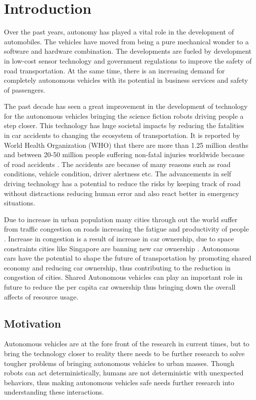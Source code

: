 \chapter{Introduction}
\label{introduction}

Over the past years, autonomy has played a vital role in the development of automobiles. The vehicles have moved from being a pure mechanical wonder to a software and hardware combination. The developments are fueled by development in low-cost sensor technology and government regulations to improve the safety of road transportation. At the same time, there is an increasing demand for completely autonomous vehicles with its potential in business services and safety of passengers.

The past decade has seen a great improvement in the development of technology for the autonomous vehicles bringing the science fiction robots driving people a step closer. This technology has huge societal impacts by reducing the fatalities in car accidents to changing the ecosystem of transportation. It is reported by World Health Organization (WHO) that there are more than 1.25 million deaths and between 20-50 million people suffering non-fatal injuries worldwide because of road accidents \cite{whoaccidents}. The accidents are because of many reasons such as road conditions, vehicle condition, driver alertness etc. The advancements in self driving technology has a potential to reduce the risks by keeping track of road without distractions reducing human error and also react better in emergency situations. 

Due to increase in urban population many cities through out the world suffer from traffic congestion on roads increasing the fatigue and productivity of people \cite{citycongestion}. Increase in congestion is a result of increase in car ownership, due to space constraints cities like Singapore are banning new car ownership \cite{singaporebanscars}. Autonomous cars have the potential to shape the future of transportation by promoting shared economy and reducing car ownership, thus contributing to the reduction in congestion of cities. Shared Autonomous vehicles can play an important role in future to reduce the per capita car ownership thus bringing down the overall affects of resource usage. 


\section{Motivation}

Autonomous vehicles are at the fore front of the research in current times, but to bring the technology closer to reality there needs to be further research to solve tougher problems of bringing autonomous vehicles to urban masses. Though robots can act deterministically, humans are not deterministic with unexpected behaviors, thus making autonomous vehicles safe needs further research into understanding these interactions. 

